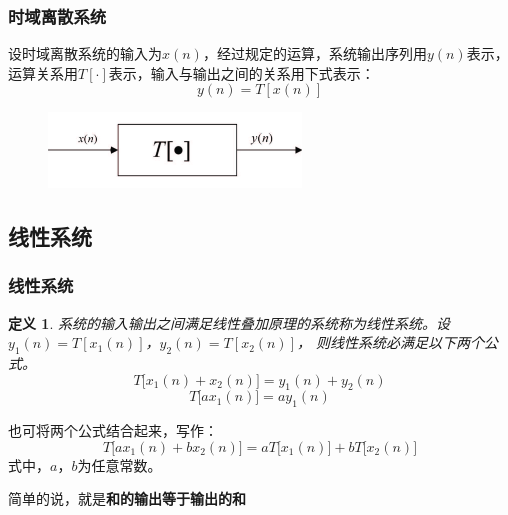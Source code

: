 \documentclass[notheorems,compress,mathserif,table]{beamer}
\newtheorem{definition}{定义}
\begin{document}
\begin{frame}\frametitle{时域离散系统}%

设时域离散系统的输入为$x(n)$，经过规定的运算，系统输出序列用$y(n)$表示，
运算关系用$T[\cdot]$表示，输入与输出之间的关系用下式表示：
\begin{equation*}
    y(n)=T[x(n)]
\end{equation*}
\begin{figure}[h]
  \centering
  \includegraphics[width=0.6\textwidth]{shiyulisanxitong.jpg}\\
\end{figure}
\end{frame}


\subsection{线性系统}
\begin{frame}\frametitle{线性系统}%
\begin{definition}
系统的输入输出之间满足线性叠加原理的系统称为线性系统。设$y_{1}(n)= T[x_{1}(n)]$，$y_{2}(n)= T[x_{2}(n)]$，
则线性系统必满足以下两个公式。
\begin{equation*}
     T\big[x_{1}(n)+x_{2}(n)\big] = y_{1}(n) + y_{2}(n)
\end{equation*}
\begin{equation*}
     T\big[ax_{1}(n)\big] = ay_{1}(n)
\end{equation*}
\end{definition}
也可将两个公式结合起来，写作：
\begin{equation*}
     T\big[ax_{1}(n)+bx_{2}(n)\big] = aT\big[x_{1}(n)\big]+bT\big[x_{2}(n)\big]
\end{equation*}
式中，$a$，$b$为任意常数。

简单的说，就是\textbf{和的输出等于输出的和}
\end{frame}
\end{document}
